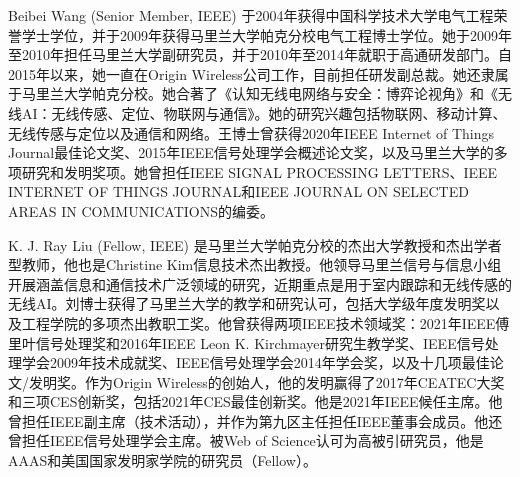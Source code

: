 \documentclass[journal]{IEEEtran}
\begin{document}
\begin{IEEEbiographynophoto}{Beibei Wang} (Senior Member, IEEE) 
于2004年获得中国科学技术大学电气工程荣誉学士学位，并于2009年获得马里兰大学帕克分校电气工程博士学位。她于2009年至2010年担任马里兰大学副研究员，并于2010年至2014年就职于高通研发部门。自2015年以来，她一直在Origin Wireless公司工作，目前担任研发副总裁。她还隶属于马里兰大学帕克分校。她合著了《认知无线电网络与安全：博弈论视角》和《无线AI：无线传感、定位、物联网与通信》。她的研究兴趣包括物联网、移动计算、无线传感与定位以及通信和网络。王博士曾获得2020年IEEE Internet of Things Journal最佳论文奖、2015年IEEE信号处理学会概述论文奖，以及马里兰大学的多项研究和发明奖项。她曾担任IEEE SIGNAL PROCESSING LETTERS、IEEE INTERNET OF THINGS JOURNAL和IEEE JOURNAL ON SELECTED AREAS IN COMMUNICATIONS的编委。
\end{IEEEbiographynophoto}

\begin{IEEEbiographynophoto}{K. J. Ray Liu} (Fellow, IEEE) 
是马里兰大学帕克分校的杰出大学教授和杰出学者型教师，他也是Christine Kim信息技术杰出教授。他领导马里兰信号与信息小组开展涵盖信息和通信技术广泛领域的研究，近期重点是用于室内跟踪和无线传感的无线AI。刘博士获得了马里兰大学的教学和研究认可，包括大学级年度发明奖以及工程学院的多项杰出教职工奖。他曾获得两项IEEE技术领域奖：2021年IEEE傅里叶信号处理奖和2016年IEEE Leon K. Kirchmayer研究生教学奖、IEEE信号处理学会2009年技术成就奖、IEEE信号处理学会2014年学会奖，以及十几项最佳论文/发明奖。作为Origin Wireless的创始人，他的发明赢得了2017年CEATEC大奖和三项CES创新奖，包括2021年CES最佳创新奖。他是2021年IEEE候任主席。他曾担任IEEE副主席（技术活动），并作为第九区主任担任IEEE董事会成员。他还曾担任IEEE信号处理学会主席。被Web of Science认可为高被引研究员，他是AAAS和美国国家发明家学院的研究员（Fellow）。
\end{IEEEbiographynophoto}
\end{document}
